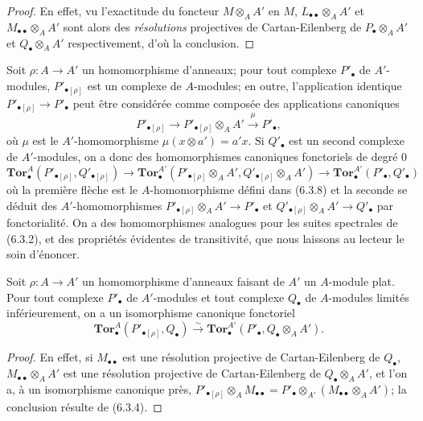 \begin{proof}
En effet, vu l'exactitude du foncteur $M\otimes_A A'$ en $M$,
$L_{\bullet\bullet}\otimes_A A'$ et $M_{\bullet\bullet}\otimes_A A'$ sont
alors des \emph{résolutions} projectives de Cartan-Eilenberg de
$P_\bullet\otimes_A A'$ et $Q_\bullet\otimes_A A'$ respectivement, d'où la
conclusion.
\end{proof}

\begin{env}[6.3.10]
Soit $\rho:A\to A'$ un homomorphisme d'anneaux; pour tout complexe
$P'_\bullet$ de $A'$-modules, $P'_{\bullet[\rho]}$ est un complexe de
$A$-modules; en outre, l'application identique
$P'_{\bullet[\rho]}\to P'_\bullet$ peut être considérée comme composée des
applications canoniques
\[
  P'_{\bullet[\rho]}\longrightarrow
  P'_{\bullet[\rho]}\otimes_A A'
  \xrightarrow{\mu}P'_\bullet,
\]
où $\mu$ est le $A'$-homomorphisme $\mu(x\otimes a')=a'x$. Si $Q'_\bullet$
est un second complexe de $A'$-modules, on a donc des homomorphismes
canoniques fonctoriels de degré 0
\[
  \mathbf{Tor}_\bullet^A(P'_{\bullet[\rho]},Q'_{\bullet[\rho]})
  \longrightarrow
  \mathbf{Tor}_\bullet^{A'}
  (P'_{\bullet[\rho]}\otimes_A A',Q'_{\bullet[\rho]}\otimes_A A')
  \longrightarrow
  \mathbf{Tor}_\bullet^{A'}(P'_\bullet,Q'_\bullet)
  \tag{6.3.10.1}\label{III.6.3.10.1.fr}
\]
où la première flèche est le $A$-homomorphisme défini dans (6.3.8) et la
seconde se déduit des $A'$-homomorphismes
$P'_{\bullet[\rho]}\otimes_A A'\to P'_\bullet$ et
$Q'_{\bullet[\rho]}\otimes_A A'\to Q'_\bullet$ par fonctorialité. On a des
homomorphismes analogues pour les suites spectrales de (6.3.2), et des
propriétés évidentes de transitivité, que nous laissons au lecteur le soin
d'énoncer.
\end{env}

\begin{proposition}[6.3.11]
Soit $\rho:A\to A'$ un homomorphisme d'anneaux faisant de $A'$ un
$A$-module plat. Pour tout complexe $P'_\bullet$ de $A'$-modules et tout
complexe $Q_\bullet$ de $A$-modules limités inférieurement, on a un
isomorphisme canonique fonctoriel
\[
  \mathbf{Tor}_\bullet^A(P'_{\bullet[\rho]},Q_\bullet)
  \xrightarrow{\sim}
  \mathbf{Tor}_\bullet^{A'}(P'_\bullet,Q_\bullet\otimes_A A').
  \tag{6.3.11.1}\label{III.6.3.11.1.fr}
\]
\end{proposition}

\begin{proof}
En effet, si $M_{\bullet\bullet}$ est une résolution projective de
Cartan-Eilenberg de $Q_\bullet$, $M_{\bullet\bullet}\otimes_A A'$ est une
résolution projective de Cartan-Eilenberg de $Q_\bullet\otimes_A A'$, et
l'on a, à un isomorphisme canonique près,
$P'_{\bullet[\rho]}\otimes_A M_{\bullet\bullet}
=P'_\bullet\otimes_{A'}(M_{\bullet\bullet}\otimes_A A')$;
la conclusion résulte de (6.3.4).
\end{proof}

